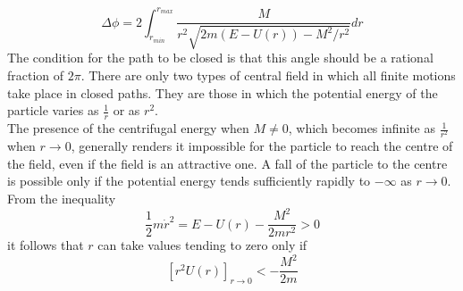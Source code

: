 \documentclass[cyan]{elegantnote}
\begin{document}
\[\Delta \phi = 2 \int_{r_{min}}^{r_{max}} \frac{M}{r^2 \sqrt{2m(E-U(r))-M^2/r^2}} dr\]
The condition for the path to be closed is that this angle should be a rational fraction of $2\pi$. There are only two types of central field in which all finite motions take place in closed paths. They are those in which the potential energy of the particle varies as $\frac{1}{r}$ or as $r^2$.\\
The presence of the centrifugal energy when $M \neq 0$, which becomes infinite as $\frac{1}{r^2}$ when $r \to 0$, generally renders it impossible for the particle to reach the centre of the field, even if the field is an attractive one. 
A fall of the particle to the centre is possible only if the potential energy tends sufficiently rapidly to $-\infty$ as $r \to 0$. From the inequality
\[\frac{1}{2} m\dot{r}^2 = E - U(r) - \frac{M^2}{2mr^2} > 0\]
it follows that $r$ can take values tending to zero only if
\[[r^2 U(r)]_{r\to 0} < -\frac{M^2}{2m}\]
\end{document}
